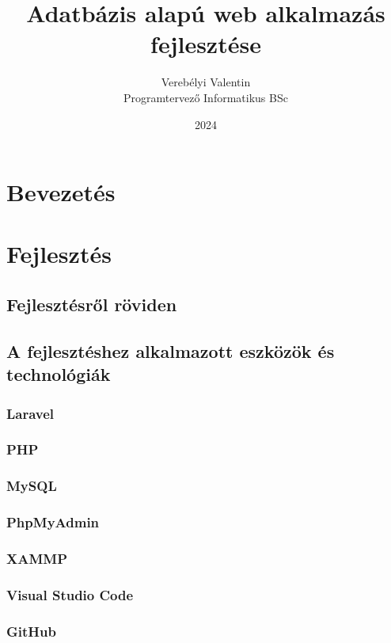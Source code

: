 \documentclass[]{thesis-ekf}
\theoremstyle{definition}
\theoremstyle{remark}
\begin{document}
	\title{Adatbázis alapú web alkalmazás fejlesztése}
	\author{Verebélyi Valentin\\Programtervező Informatikus BSc}
	\date{2024}
	\maketitle
	\tableofcontents
	
	\chapter*{Bevezetés}

	
	\chapter{Fejlesztés}
	\section{Fejlesztésről röviden}
	\section{A fejlesztéshez alkalmazott eszközök és technológiák}
	\subsection{Laravel}
		
		
	\subsection{PHP}
	\subsection{MySQL}
	\subsection{PhpMyAdmin}
	\subsection{XAMMP}
	\subsection{Visual Studio Code}
	\subsection{GitHub}
\end{document}
